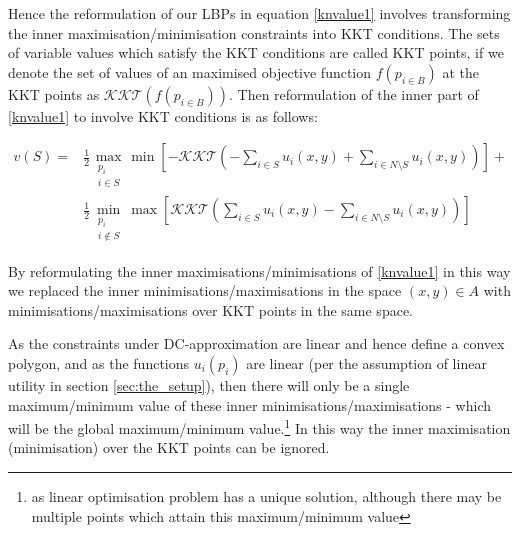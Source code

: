 Hence the reformulation of our LBPs in equation \ref{knvalue1} involves transforming the inner maximisation/minimisation constraints into KKT conditions.
The sets of variable values which satisfy the KKT conditions are called KKT points, if we denote the set of values of an maximised objective function $f(p_{i\in B})$ at the KKT points as $\mathcal{KKT}(f(p_{i\in B}))$.
Then reformulation of the inner part of \eqref{knvalue1} to involve KKT conditions is as follows:




\begin{equation}
\label{kkt_optimization1}
\begin{aligned}
v(S) =& 
 \frac{1}{2}\max_{\substack{p_i \\ i\in S}}   \min\left[-\mathcal{KKT}\left(-\sum_{i\in S} u_i(x,y) + \sum_{i\in N\setminus S}u_i(x,y)\right)\right] +\\
&\frac{1}{2}\min_{\substack{p_i \\ i\notin S}}\max\left[\mathcal{KKT}\left(\sum_{i\in S} u_i(x,y) - \sum_{i\in N\setminus S}u_i(x,y)\right)\right]
\end{aligned}
\end{equation}


By reformulating the inner maximisations/minimisations of \eqref{knvalue1} in this way we replaced the inner minimisations/maximisations in the space $(x,y)\in A$ with minimisations/maximisations over KKT points in the same space.%

As the constraints under DC-approximation are linear and hence define a convex polygon,
and as the functions $u_i(p_i)$ are linear (per the assumption of linear utility in section \ref{sec:the_setup}), then there will only be a single maximum/minimum value of these inner minimisations/maximisations - which will be the global maximum/minimum value.\footnote{as linear optimisation problem has a unique solution, although there may be multiple points which attain this maximum/minimum value}
In this way the inner maximisation (minimisation) over the KKT points can be ignored.

